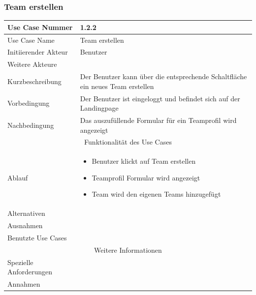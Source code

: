 \documentclass[10pt,a4paper]{article}
\begin{document}
		\subsubsection{Team erstellen}
		\begin{tabularx}{\textwidth}{|l|X|}
				\hline Use Case Nummer & 1.2.2 \\ 
				\hline Use Case Name & Team erstellen \\ 
				\hline Initiierender Akteur & Benutzer \\
				\hline Weitere Akteure & \\
				\hline Kurzbeschreibung & Der Benutzer kann über die entsprechende Schaltfläche ein neues Team erstellen \\
				\hline Vorbedingung & Der Benutzer ist eingeloggt und befindet sich auf der Landingpage \\
				\hline Nachbedingung & Das auszufüllende Formular für ein Teamprofil wird angezeigt \\
				\hline \multicolumn{2}{|c|}{Funktionalität des Use Cases}\\
				\hline Ablauf & \begin{itemize}
					\item Benutzer klickt auf Team erstellen
					\item Teamprofil Formular wird angezeigt
					\item Team wird den eigenen Teams hinzugefügt
				\end{itemize} \\
				\hline Alternativen & \\
				\hline Ausnahmen & \\
				\hline Benutzte Use Cases & \\
				\hline \multicolumn{2}{|c|}{Weitere Informationen} \\
				\hline Spezielle Anforderungen & \\
				\hline Annahmen & \\
				\hline
		\end{tabularx}
			
\end{document}
